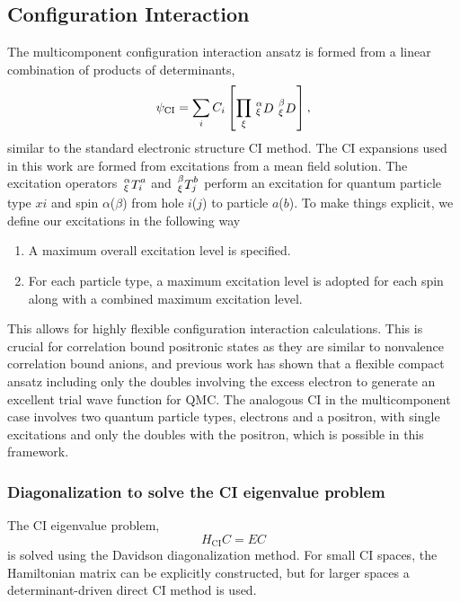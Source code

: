 \subsection{Configuration Interaction}
The multicomponent configuration interaction ansatz is formed from a linear combination of products of determinants,
\begin{equation}
    \psi_{\mathrm{CI}} = \sum_{i} C_{i} 
    \left[ 
    \prod_{\xi}
    \shivten{\alpha}{\xi}{D}{}{}
    \shivten{\beta}{\xi}{D}{}{}
    \right],
\end{equation}
similar to the standard electronic structure CI method.
The CI expansions used in this work are formed from excitations from a mean field solution.
The excitation operators $\shivten{\alpha}{\xi}{T}{a}{i}$ and $\shivten{\beta}{\xi}{T}{b}{j}$ perform an excitation for quantum particle type $xi$ and spin $\alpha$($\beta$) from hole $i$($j$) to particle $a$($b$).
To make things explicit, we define our excitations in the following way
\begin{enumerate}
    \item A maximum overall excitation level is specified.
    \item For each particle type, a maximum excitation level is adopted for each spin along with a combined maximum excitation level.
\end{enumerate}
This allows for highly flexible configuration interaction calculations.
This is crucial for correlation bound positronic states as they are similar to nonvalence correlation bound anions, and previous work has shown that a flexible compact ansatz including only the doubles involving the excess electron to generate an excellent trial wave function for QMC.
The analogous CI in the multicomponent case involves two quantum particle types, electrons and a positron, with single excitations and only the doubles with the positron, which is possible in this framework.

\subsubsection{Diagonalization to solve the CI eigenvalue problem}
The CI eigenvalue problem,
\begin{equation}
    H_{\mathrm{CI}} C = E C
\end{equation}
is solved using the Davidson diagonalization method.\cite{10.1016/0021-99917590065-0}
For small CI spaces, the Hamiltonian matrix can be explicitly constructed, but for larger spaces a determinant-driven direct CI method is used.

